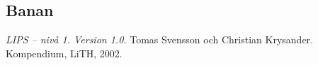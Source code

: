 \documentclass[a4paper,12pt]{article}
\begin{document}
%
%


\subsection{Banan} 


\begin{thebibliography}{99}
\textit{LIPS -- nivå 1. Version 1.0.} Tomas Svensson
och Christian Krysander. Kompendium, LiTH, 2002.
\end{thebibliography}
\end{document}
